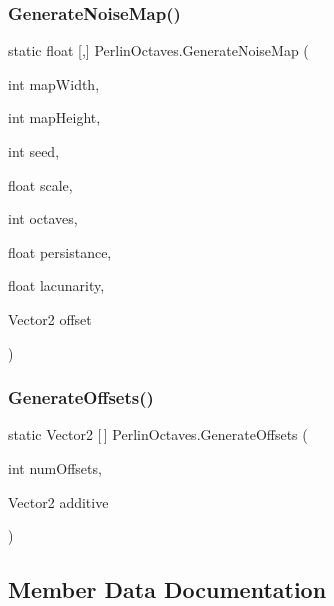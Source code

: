 \subsubsection{\texorpdfstring{Generate\+Noise\+Map()}{GenerateNoiseMap()}}
{\footnotesize\ttfamily static float \mbox{[},\mbox{]} Perlin\+Octaves.\+Generate\+Noise\+Map (\begin{DoxyParamCaption}\item[{int}]{map\+Width,  }\item[{int}]{map\+Height,  }\item[{int}]{seed,  }\item[{float}]{scale,  }\item[{int}]{octaves,  }\item[{float}]{persistance,  }\item[{float}]{lacunarity,  }\item[{Vector2}]{offset }\end{DoxyParamCaption})\hspace{0.3cm}{\ttfamily [static]}}

\mbox{\label{class_perlin_octaves_a1a9290ee85b1250215cd042223cc7ed9}} 
\subsubsection{\texorpdfstring{Generate\+Offsets()}{GenerateOffsets()}}
{\footnotesize\ttfamily static Vector2 \mbox{[}$\,$\mbox{]} Perlin\+Octaves.\+Generate\+Offsets (\begin{DoxyParamCaption}\item[{int}]{num\+Offsets,  }\item[{Vector2}]{additive }\end{DoxyParamCaption})\hspace{0.3cm}{\ttfamily [static]}}



\subsection{Member Data Documentation}
\mbox{\label{class_perlin_octaves_a77574e7d920b80d15916798a4a7900d7}} 
